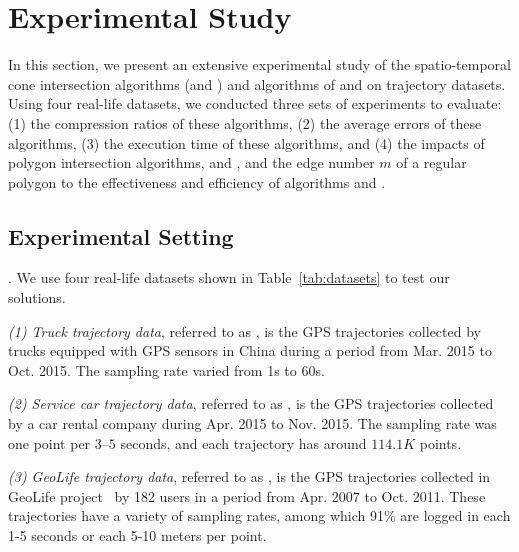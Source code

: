 \section{Experimental Study} %
\label{sec-exp}
In this section, we present an extensive experimental study of the spatio-temporal cone intersection algorithms (\cist and \cista) and algorithms of \dps and \squishe on trajectory datasets.
Using four real-life datasets, we conducted three sets of experiments to evaluate:
(1) the compression ratios of these algorithms,
(2) the average errors of these algorithms,
(3) the execution time of these algorithms, and
(4) the impacts of polygon intersection algorithms, \rpia and \cpia, and the edge number $m$ of a regular polygon to the effectiveness and efficiency of algorithms \cist and \cista.


\subsection{Experimental Setting}

.
We use four real-life datasets shown in Table~\ref{tab:datasets} to test our solutions.

\vspace{0.5ex}
\ni \emph{(1) Truck trajectory data}, referred to as \truck, is the GPS trajectories collected by  trucks equipped with GPS sensors in China
during a period from Mar. 2015 to Oct. 2015. The sampling rate varied from 1s to 60s.

\vspace{0.5ex}
\ni \emph{(2) Service car trajectory data}, referred to as \sercar,  is the GPS trajectories collected by a car rental company during Apr. 2015 to Nov. 2015. The sampling rate was one point per $3$--$5$ seconds, and
each trajectory has around $114.1K$ points.

\vspace{0.5ex}
\ni \emph{(3) GeoLife trajectory data}, referred to as \geolife, is the GPS trajectories collected in GeoLife project~\cite{Zheng:GeoLife} by 182 users in a period from Apr. 2007 to Oct. 2011. These trajectories have a variety of sampling rates, among which 91\% are logged in each 1-5 seconds or each 5-10 meters per point.

